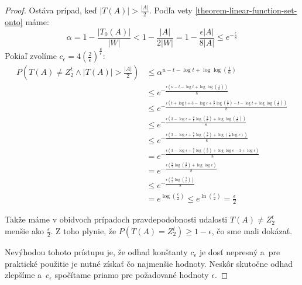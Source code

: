 \begin{proof}
Ostáva prípad, keď $|T(A)| > \frac{|A|}{2}$. Podľa vety \ref{theorem-linear-function-set-onto} máme:
\begin{displaymath}
\alpha = 1 - \frac{|T_0(A)|}{|W|} < 1 - \frac{|A|}{2|W|} = 1 - \frac{\epsilon |A|}{8|A|} \leq e^{-\frac{\epsilon}{8}}
\end{displaymath}
Pokiaľ zvolíme $c_\epsilon = 4\left(\frac{2}{\epsilon}\right)^{\frac{8}{\epsilon}}$:
\begin{displaymath}
\begin{split}
P(T(A) \neq Z_2^t \wedge |T(A)| > \frac{|A|}{2}) 
	& \leq \alpha ^ {u - t - \log t + \log\log\left(\frac{1}{\alpha}\right)} \\
	& \leq e^{-\frac{\epsilon\left(u - t - \log t + \log\log\left(\frac{1}{\alpha}\right)\right)}{8}}	\\
	& \leq e^{-\frac{\epsilon\left(t + \log t + 3 - \log \epsilon + \frac{8}{\epsilon}\log\left(\frac{2}{\epsilon}\right) -t - \log t  + \log\log\left(\frac{1}{\alpha}\right)\right)}{8}} \\
	& \leq e^{-\frac{\epsilon \left(3 - \log \epsilon + \frac{8}{\epsilon}\log\left(\frac{2}{\epsilon}\right) + \log\log\left(\frac{1}{\alpha}\right) \right)}{8}} \\
	& \leq e^{-\frac{\epsilon \left(3 - \log \epsilon + \frac{8}{\epsilon}\log\left(\frac{2}{\epsilon}\right) + \log\left(\frac{\epsilon}{8} \log e \right) \right)}{8}} \\
	& =    e^{-\frac{\epsilon \left(3 - \log \epsilon + \frac{8}{\epsilon}\log\left(\frac{2}{\epsilon}\right) + \log\log e - 3 + \log \epsilon \right)}{8}} \\
	& =    e^{-\frac{\epsilon \left(                    \frac{8}{\epsilon}\log\left(\frac{2}{\epsilon}\right) + \log\log e \right)}{8}} \\
	& \leq e^{-\frac{\epsilon \left(                    \frac{8}{\epsilon}\log\left(\frac{2}{\epsilon}\right) \right)}{8}} \\
	& = e^{{\log\left(\frac{\epsilon}{2}\right)}} 
	\leq e^{\ln\left(\frac{\epsilon}{2}\right)} 
	= \frac{\epsilon}{2}
\end{split}
\end{displaymath}

Takže máme v obidvoch prípadoch pravdepodobnosti udalosti $T(A) \neq Z_2^t$ menšie ako $\frac{\epsilon}{2}$. Z toho plynie, že $P(T(A) = Z_2^t) \geq 1 - \epsilon$, čo sme mali dokázať.

Nevýhodou tohoto prístupu je, že odhad konštanty $c_\epsilon$ je dosť nepresný a~pre praktické použitie je nutné získať čo najmenšie hodnoty. Neskôr skutočne odhad zlepšíme a~$c_\epsilon$ spočítame priamo pre požadované hodnoty $\epsilon$.
\end{proof}

